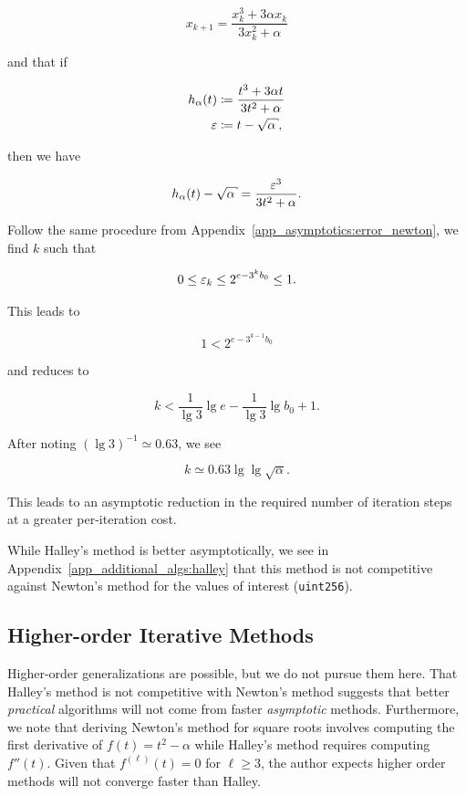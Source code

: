 \begin{equation}
    x_{k+1} = \frac{x_{k}^{3} + 3\alpha x_{k}}{3x_{k}^{2} + \alpha}
\end{equation}

\noindent
and that if

\begin{align}
    h_{\alpha}(t) &\algAssign{} \frac{t^{3} + 3\alpha t}{3t^{2} + \alpha}
        \nonumber\\
    \eps &\algAssign{} t - \sqrt{\alpha},
\end{align}

\noindent
then we have

\begin{equation}
    h_{\alpha}(t) - \sqrt{\alpha}= \frac{\eps^{3}}{3t^{2} + \alpha}.
\end{equation}

Follow the same procedure from Appendix~\ref{app_asymptotics:error_newton},
we find $k$ such that

\begin{equation}
    0 \le \varepsilon_{k} \le 2^{e-3^{k}b_{0}} \le 1.
\end{equation}

\noindent
This leads to

\begin{equation}
    1 <  2^{e-3^{k-1}b_{0}}
\end{equation}

\noindent
and reduces to

\begin{equation}
    k < \frac{1}{\lg 3}\lg e - \frac{1}{\lg 3}\lg b_{0} + 1.
\end{equation}

\noindent
After noting $(\lg 3)^{-1}\simeq 0.63$, we see

\begin{equation}
    k \simeq 0.63\lg\lg \sqrt{\alpha}.
\end{equation}

\noindent
This leads to an asymptotic reduction in the required number of iteration steps
at a greater per-iteration cost.

While Halley's method is better asymptotically,
we see in Appendix~\ref{app_additional_algs:halley}
that this method is not competitive against Newton's method
for the values of interest (\texttt{uint256}).


\subsection{Higher-order Iterative Methods}

Higher-order generalizations are possible,
but we do not pursue them here.
That Halley's method is not competitive with Newton's method suggests
that better \emph{practical} algorithms will not come from
faster \emph{asymptotic} methods.
Furthermore, we note that deriving Newton's method for square roots
involves computing the first derivative of $f(t) = t^{2} - \alpha$
while Halley's method requires computing $f''(t)$.
Given that $f^{(\ell)}(t) = 0$ for $\ell\ge3$,
the author expects higher order methods will not converge faster than Halley.
